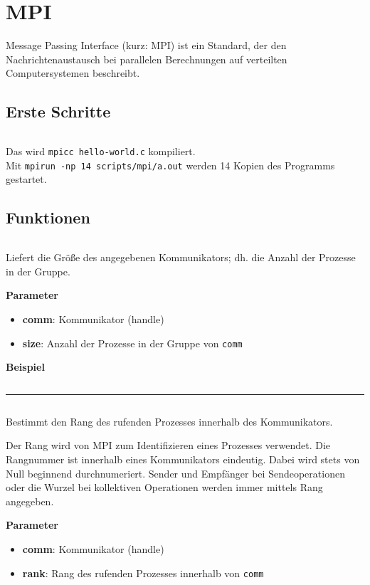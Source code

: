 \chapter{MPI}

Message Passing Interface (kurz: MPI) ist ein Standard, 
der den Nachrichtenaustausch bei parallelen Berechnungen auf 
verteilten Computersystemen beschreibt.

\section{Erste Schritte}
\inputminted[numbersep=5pt, tabsize=4, frame=lines, label=hello-world.c]{c}{scripts/mpi/hello-world.c}

Das wird \texttt{mpicc hello-world.c} kompiliert.\\
Mit \texttt{mpirun -np 14 scripts/mpi/a.out} werden 14 Kopien des Programms
gestartet.

\section{Funktionen}
\inputminted[numbersep=5pt, tabsize=4]{c}{scripts/mpi/comm-size.c}
Liefert die Größe des angegebenen Kommunikators; dh. die Anzahl der Prozesse in der Gruppe.

\textbf{Parameter}
\begin{itemize}
    \item \textbf{comm}: Kommunikator (handle)
    \item \textbf{size}: Anzahl der Prozesse in der Gruppe von \texttt{comm}
\end{itemize}

\textbf{Beispiel}
\inputminted[numbersep=5pt, tabsize=4]{c}{scripts/mpi/comm-size-example.c}
\rule{\textwidth}{0.4pt}
\inputminted[numbersep=5pt, tabsize=4]{c}{scripts/mpi/comm-rank.c}
Bestimmt den Rang des rufenden Prozesses innerhalb des Kommunikators.

Der Rang wird von MPI zum Identifizieren eines Prozesses verwendet. Die Rangnummer ist innerhalb eines Kommunikators eindeutig. Dabei wird stets von Null beginnend durchnumeriert. Sender und Empfänger bei Sendeoperationen oder die Wurzel bei kollektiven Operationen werden immer mittels Rang angegeben.

\textbf{Parameter}
\begin{itemize}
    \item \textbf{comm}: Kommunikator (handle)
    \item \textbf{rank}: Rang des rufenden Prozesses innerhalb von \texttt{comm}
\end{itemize}

